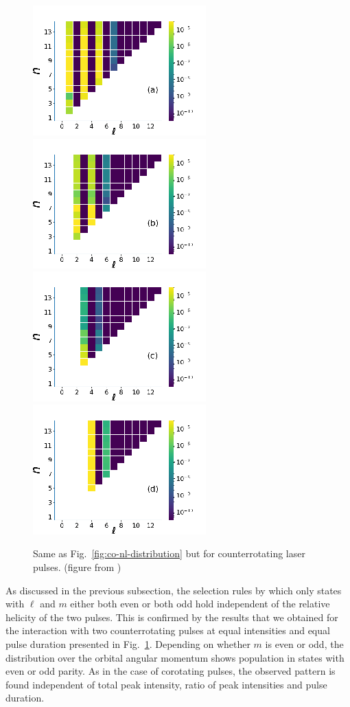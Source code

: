 \begin{figure}[!ht]
\centering
\includegraphics[width=0.24\columnwidth]{figs/Rydberg/Gebre-bicircular-Fig6a.png}
\includegraphics[width=0.24\columnwidth]{figs/Rydberg/Gebre-bicircular-Fig6b.png}
\includegraphics[width=0.24\columnwidth]{figs/Rydberg/Gebre-bicircular-Fig6c.png}
\includegraphics[width=0.24\columnwidth]{figs/Rydberg/Gebre-bicircular-Fig6d.png}
\caption{\label{fig:counter-nl-distribution}
Same as Fig.\ \ref{fig:co-nl-distribution} but for counterrotating laser pulses. (figure from \cite{venzke2020_ryd})
}
\end{figure}

As discussed in the previous subsection, the selection rules by which only states with $\ell$ and $m$ either both even or both odd hold independent of the relative helicity of the two pulses. This is confirmed by the results that we obtained for the interaction with two counterrotating pulses at equal intensities and equal pulse duration presented in Fig.\ \ref{fig:counter-nl-distribution}. Depending on whether $m$ is even or odd, the distribution over the orbital angular momentum shows population in states with even or odd parity. As in the case of corotating pulses, the observed pattern is found independent of total peak intensity, ratio of peak intensities and pulse duration.


